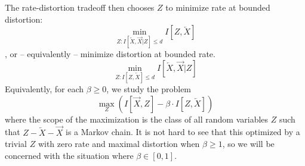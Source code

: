 \documentclass[11pt,letterpaper]{article}
\begin{document}
The rate-distortion tradeoff then chooses $Z$ to minimize rate at bounded distortion:
$$\min_{Z : I[\overleftarrow{X}, \overrightarrow{X}|Z] \leq d} I[Z, \overleftarrow{X}]$$
, or -- equivalently -- minimize distortion at bounded rate.
$$\min_{Z :  I[Z, \overleftarrow{X}] \leq d}  I[\overleftarrow{X}, \overrightarrow{X}|Z] $$
Equivalently, for each  $\beta \geq 0$, we study the problem 
\begin{equation}\label{eq:ib}
	\max_{Z} \left( I[\overrightarrow{X}, Z] - \beta \cdot I[Z, \overleftarrow{X}] \right)
\end{equation}
where the scope of the maximization is the class of all random variables $Z$ such that $Z - \overleftarrow{X} - \overrightarrow{X}$ is a Markov chain. %
It is not hard to see that this optimized by a trivial $Z$ with zero rate and maximal distortion when $\beta \geq 1$, so we will be concerned with the situation where $\beta \in [0,1]$.

%
%
%
%
%
%
\end{document}
